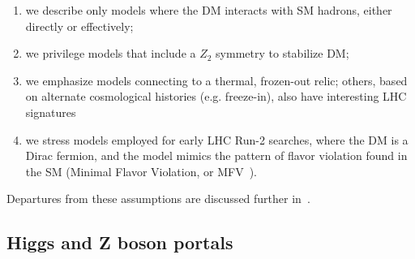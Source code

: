 \begin{enumerate}
\item we describe only models where the DM interacts with SM hadrons, either directly or effectively;
\item we privilege models that include a $Z_2$ symmetry to stabilize DM;
\item we emphasize models connecting to a thermal, frozen-out relic; others, based on alternate cosmological histories (e.g. freeze-in), also have interesting LHC signatures~\cite{Bernal:2017kxu}

\item we stress models employed for early LHC Run-2 searches, where the DM is a Dirac fermion, and the model mimics the pattern of flavor violation found in the SM (Minimal Flavor Violation, or MFV~\cite{DAmbrosio:2002vsn}).
\end{enumerate}
Departures from these assumptions are discussed further in~\cite{Abercrombie:2015wmb}. 


\subsection{Higgs and Z boson portals}
\label{sec:HZPortalModels}

